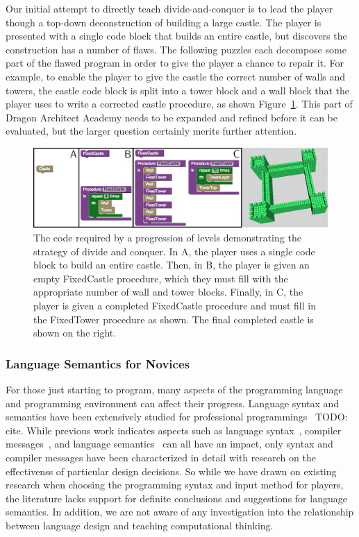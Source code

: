 \documentclass{sig-alternate}
\newcommand{\TODO}[1]{{\color{red} TODO: #1}}
\newcommand{\gametitle}{{\color{RoyalPurple} Dragon Architect Academy}}
\begin{document}
Our initial attempt to directly teach divide-and-conquer is to lead the player though a top-down deconstruction of building a large castle.
The player is presented with a single code block that builds an entire castle, but discovers the construction has a number of flaws. 
The following puzzles each decompose some part of the flawed program in order to give the player a chance to repair it. 
For example, to enable the player to give the castle the correct number of walls and towers, the castle code block is split into a tower block and a wall block that the player uses to write a corrected castle procedure, as shown Figure~\ref{fig:decomp}. 
This part of \gametitle{} needs to be expanded and refined before it can be evaluated, but the larger question certainly merits further attention. 

\begin{figure}[th!]
  \centering
  \includegraphics[width=\textwidth]{images/decomp-code}
  \caption{The code required by a progression of levels demonstrating the strategy of divide and conquer. In A, the player uses a single code block to build an entire castle. Then, in B, the player is given an empty FixedCastle procedure, which they must fill with the appropriate number of wall and tower blocks. Finally, in C, the player is given a completed FixedCastle procedure and must fill in the FixedTower procedure as shown. The final completed castle is shown on the right.}
  \label{fig:decomp}
\end{figure}

\subsubsection{Language Semantics for Novices}

For those just starting to program, many aspects of the programming language and programming environment can affect their progress. 
Language syntax and semantics have been extensively studied for professional programmings~\TODO{cite}.
While previous work indicates aspects such as language syntax~\cite{stefik2013syntax}, compiler messages~\cite{nienaltowski2008compiler}, and language semantics~\cite{hoc1990language} can all have an impact, only syntax and compiler messages have been characterized in detail with research on the effectivenss of particular design decisions. 
So while we have drawn on existing research when choosing the programming syntax and input method for players, the literature lacks support for definite conclusions and suggestions for language semantics. 
In addition, we are not aware of any investigation into the relationship between language design and teaching computational thinking.
\end{document}
